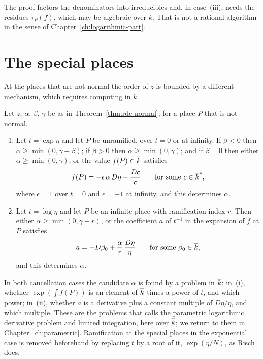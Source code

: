 The proof factors the denominators into irreducibles and, in case~(iii),
needs the residues $\tau_P(f)$, which may be algebraic over $k$. That is not
a rational algorithm in the sense of Chapter~\ref{ch:logarithmic-part}.

\section{The special places}\label{sec:rde-special}

At the places that are not normal the order of $z$ is bounded by a different
mechanism, which requires computing in $k$.

\begin{theorem}\label{thm:rde-special}
Let $z$, $\alpha$, $\beta$, $\gamma$ be as in Theorem~\ref{thm:rde-normal},
for a place $P$ that is not normal.
\begin{enumerate}[label=\textup{(\roman*)}]
\item Let $t = \exp \eta$ and let $P$ be unramified, over $t = 0$ or at
  infinity. If $\beta < 0$ then $\alpha \ge \min(0, \gamma - \beta)$; if
  $\beta > 0$ then $\alpha \ge \min(0, \gamma)$; and if $\beta = 0$ then
  either $\alpha \ge \min(0, \gamma)$, or the value $f(P) \in \overline{k}$ satisfies
  \[
    f(P) = -\epsilon\,\alpha\, D\eta - \frac{Dc}{c}
    \qquad \text{for some } c \in \overline{k}^*,
  \]
  where $\epsilon = 1$ over $t = 0$ and $\epsilon = -1$ at infinity, and this
  determines $\alpha$.
\item Let $t = \log \eta$ and let $P$ be an infinite place with ramification
  index $r$. Then either $\alpha \ge \min(0, \gamma - r)$, or the coefficient
  $a$ of $t^{-1}$ in the expansion of $f$ at $P$ satisfies
  \[
    a = -D\beta_0 + \frac{\alpha}{r}\, \frac{D\eta}{\eta}
    \qquad \text{for some } \beta_0 \in \overline{k} ,
  \]
  and this determines $\alpha$.
\end{enumerate}
\end{theorem}

In both cancellation cases the candidate $\alpha$ is found by a problem in
$\overline{k}$: in~(i), whether $\exp(\int f(P))$ is an element of $\overline{k}$ times a
power of $t$, and which power; in~(ii), whether $a$ is a derivative plus a
constant multiple of $D\eta/\eta$, and which multiple. These are the
problems that  calls the parametric logarithmic derivative
problem and limited integration, here over $\overline{k}$; we return to them in
Chapter~\ref{ch:parametric}. Ramification at the special places in the
exponential case is removed beforehand by replacing $t$ by a root of it,
$\exp(\eta/N)$, as Risch does.

